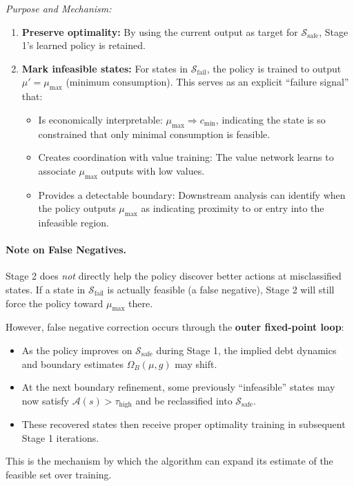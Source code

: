 \textit{Purpose and Mechanism:}
\begin{enumerate}
    \item \textbf{Preserve optimality:} By using the current output as target for $\mathcal{S}_{\text{safe}}$, Stage 1's learned policy is retained.
    \item \textbf{Mark infeasible states:} For states in $\mathcal{S}_{\text{fail}}$, the policy is trained to output $\mu' = \mu_{\max}$ (minimum consumption). This serves as an explicit ``failure signal'' that:
    \begin{itemize}
        \item Is economically interpretable: $\mu_{\max} \Rightarrow c_{\min}$, indicating the state is so constrained that only minimal consumption is feasible.
        \item Creates coordination with value training: The value network learns to associate $\mu_{\max}$ outputs with low values.
        \item Provides a detectable boundary: Downstream analysis can identify when the policy outputs $\mu_{\max}$ as indicating proximity to or entry into the infeasible region.
    \end{itemize}
\end{enumerate}

\paragraph{Note on False Negatives.}
Stage 2 does \textit{not} directly help the policy discover better actions at misclassified states. If a state in $\mathcal{S}_{\text{fail}}$ is actually feasible (a false negative), Stage 2 will still force the policy toward $\mu_{\max}$ there.

However, false negative correction occurs through the \textbf{outer fixed-point loop}:
\begin{itemize}
    \item As the policy improves on $\mathcal{S}_{\text{safe}}$ during Stage 1, the implied debt dynamics and boundary estimates $\Omega_B(\mu, g)$ may shift.
    \item At the next boundary refinement, some previously ``infeasible'' states may now satisfy $\mathcal{A}(s) > \tau_{\text{high}}$ and be reclassified into $\mathcal{S}_{\text{safe}}$.
    \item These recovered states then receive proper optimality training in subsequent Stage 1 iterations.
\end{itemize}
This is the mechanism by which the algorithm can expand its estimate of the feasible set over training.

